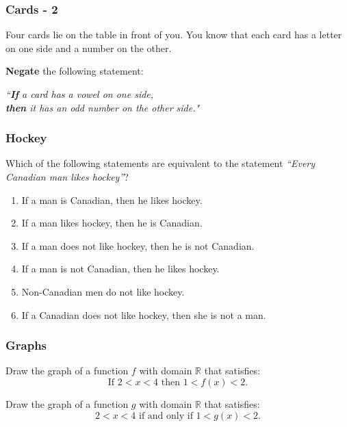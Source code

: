 \begin{frame}
	\frametitle{Cards - 2}

	Four cards lie on the table in front of you. You know that each card has a letter
	on one side and a number on the other.

	{\bfseries Negate} the following statement:
	\begin{block}{}
		\emph{``\textbf{If} a card has a vowel on one side, \\ \textbf{then} it has an
		odd number on the other side." }
	\end{block}
\end{frame}

\begin{frame}
	\frametitle{Hockey}

	Which of the following statements are equivalent to the statement \quad \emph{``Every
	Canadian man likes hockey''}?

	\begin{enumerate}
		\item If a man is Canadian, then he likes hockey.

		\item If a man likes hockey, then he is Canadian.

		\item If a man does not like hockey, then he is not Canadian.

		\item If a man is not Canadian, then he likes hockey.

		\item Non-Canadian men do not like hockey.

		\item If a Canadian does not like hockey, then she is not a man.
	\end{enumerate}
\end{frame}

\begin{frame}
	\frametitle{Graphs}

	Draw the graph of a function $f$ with domain $\mathbb{R}$ that satisfies:
	\begin{equation*}
		\text{If }2<x<4 \text{ then }1<f(x)<2.
	\end{equation*}
	\vfill

	Draw the graph of a function $g$ with domain $\mathbb{R}$ that satisfies:
	\begin{equation*}
		2<x<4 \text{ if and only if }1 < g(x) < 2.
	\end{equation*}
	\vfill
\end{frame}

